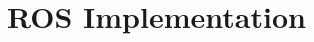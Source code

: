 \documentclass[a4paper,12pt]{article}
\begin{document}
	
	\section{ROS Implementation}
	
	
	
	
	
	
	
	
	\newpage
	\appendix
	\appendixpage
	\addappheadtotoc
	
\end{document}
